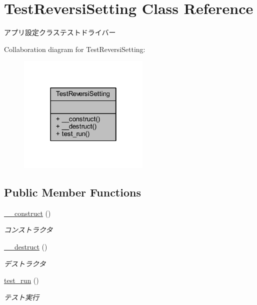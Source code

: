 \hypertarget{class_test_reversi_setting}{}\section{Test\+Reversi\+Setting Class Reference}
\label{class_test_reversi_setting}


アプリ設定クラステストドライバー  




Collaboration diagram for Test\+Reversi\+Setting\+:
\nopagebreak
\begin{figure}[H]
\begin{center}
\leavevmode
\includegraphics[width=178pt]{class_test_reversi_setting__coll__graph}
\end{center}
\end{figure}
\subsection*{Public Member Functions}
\begin{DoxyCompactItemize}
\item 
\hyperlink{class_test_reversi_setting_a095c5d389db211932136b53f25f39685}{\+\_\+\+\_\+construct} ()
\begin{DoxyCompactList}\small\item\em コンストラクタ \end{DoxyCompactList}\item 
\hyperlink{class_test_reversi_setting_a421831a265621325e1fdd19aace0c758}{\+\_\+\+\_\+destruct} ()
\begin{DoxyCompactList}\small\item\em デストラクタ \end{DoxyCompactList}\item 
\hyperlink{class_test_reversi_setting_a9b029832cfdf19c0ef36b1f5ef7b7735}{test\+\_\+run} ()
\begin{DoxyCompactList}\small\item\em テスト実行 \end{DoxyCompactList}\end{DoxyCompactItemize}


